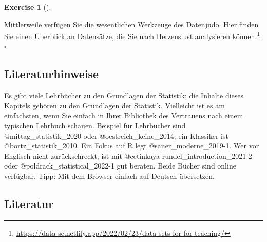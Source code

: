 \documentclass[
  letterpaper,
  DIV=11,
  numbers=noendperiod]{scrartcl}
\theoremstyle{definition}
\theoremstyle{definition}
\newtheorem{exercise}{Exercise}[section]
\theoremstyle{definition}
\theoremstyle{remark}
\begin{document}
\begin{exercise}[]\protect\hypertarget{exr-datensaetze}{}\label{exr-datensaetze}

Mittlerweile verfügen Sie die wesentlichen Werkzeuge des Datenjudo.
\href{https://data-se.netlify.app/2022/02/23/data-sets-for-for-teaching/}{Hier}
finden Sie einen Überblick an Datensätze, die Sie nach Herzenslust
analysieren können.\footnote{\url{https://data-se.netlify.app/2022/02/23/data-sets-for-for-teaching/}}
\(\square\)

\end{exercise}

\subsection{Literaturhinweise}\label{literaturhinweise}

Es gibt viele Lehrbücher zu den Grundlagen der Statistik; die Inhalte
dieses Kapitels gehören zu den Grundlagen der Statistik. Vielleicht ist
es am einfachsten, wenn Sie einfach in Ihrer Bibliothek des Vertrauens
nach einem typischen Lehrbuch schauen. Beispiel für Lehrbücher sind
@mittag\_statistik\_2020 oder @oestreich\_keine\_2014; ein Klassiker ist
@bortz\_statistik\_2010. Ein Fokus auf R legt @sauer\_moderne\_2019-1.
Wer vor Englisch nicht zurückschreckt, ist mit
@cetinkaya-rundel\_introduction\_2021-2 oder
@poldrack\_statistical\_2022-1 gut beraten. Beide Bücher sind online
verfügbar. Tipp: Mit dem Browser einfach auf Deutsch übersetzen.

\subsection{Literatur}\label{literatur}
\end{document}
